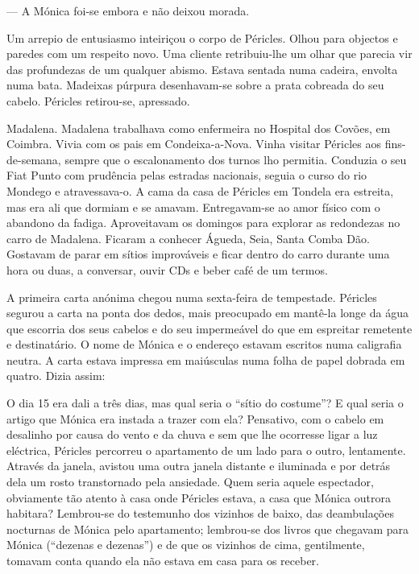 --- A Mónica foi-se embora e não deixou morada.


Um arrepio de entusiasmo inteiriçou o corpo de Péricles. Olhou para
objectos e paredes com um respeito novo. Uma cliente retribuiu-lhe um
olhar que parecia vir das profundezas de um qualquer abismo. Estava
sentada numa cadeira, envolta numa bata. Madeixas púrpura desenhavam-se
sobre a prata cobreada do seu cabelo. Péricles retirou-se, apressado.

Madalena. Madalena trabalhava como enfermeira no Hospital dos Covões, em
Coimbra. Vivia com os pais em Condeixa-a-Nova. Vinha visitar Péricles
aos fins-de-semana, sempre que o escalonamento dos turnos lho permitia.
Conduzia o seu Fiat Punto com prudência pelas estradas nacionais,
seguia o curso do rio Mondego e atravessava-o. A cama da casa de
Péricles em Tondela era estreita, mas era ali que dormiam e
se amavam. Entregavam-se ao amor físico com o abandono da fadiga.
Aproveitavam os domingos para explorar as redondezas no carro de
Madalena. Ficaram a conhecer Águeda, Seia, Santa Comba Dão. Gostavam de
parar em sítios improváveis e ficar dentro do carro durante uma hora ou
duas, a conversar, ouvir CDs e beber café de um termos.

A primeira carta anónima chegou numa sexta-feira de tempestade. Péricles
segurou a carta na ponta dos dedos, mais preocupado em mantê-la longe da
água que escorria dos seus cabelos e do seu impermeável do que em
espreitar remetente e destinatário. O nome de Mónica e o endereço
estavam escritos numa caligrafia neutra. A carta estava impressa em
maiúsculas numa folha de papel dobrada em quatro. Dizia assim:

\begin{quotation}
\end{quotation}

O dia 15 era dali a três dias, mas qual seria o ``sítio do costume''?
E qual seria o artigo que Mónica era instada a trazer com ela?
Pensativo, com o cabelo em desalinho por causa do
vento e da chuva e sem que lhe ocorresse ligar a luz eléctrica, Péricles
percorreu o apartamento de um lado para o outro, lentamente. Através da
janela, avistou uma outra janela distante e iluminada e por detrás
dela um rosto transtornado pela ansiedade. Quem seria aquele espectador,
obviamente tão atento à casa onde Péricles estava, a casa que Mónica
outrora habitara? Lembrou-se do testemunho dos vizinhos de baixo, das
deambulações nocturnas de Mónica pelo apartamento; lembrou-se dos livros
que chegavam para Mónica (``dezenas e dezenas'') e de que os vizinhos de
cima, gentilmente, tomavam conta quando ela não estava em casa para os
receber.

